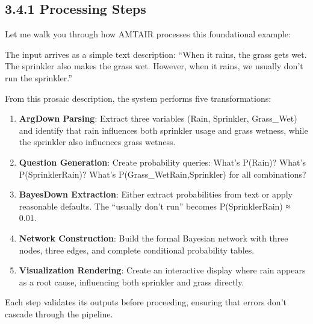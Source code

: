 \documentclass[
  11pt,
  letterpaper,
  openany]{book}
\providecommand{\tightlist}{%
  \setlength{\itemsep}{0pt}\setlength{\parskip}{0pt}}
\begin{document}
\subsection{3.4.1 Processing Steps}\label{sec-rsg-processing}

Let me walk you through how AMTAIR processes this foundational example:

The input arrives as a simple text description: ``When it rains, the
grass gets wet. The sprinkler also makes the grass wet. However, when it
rains, we usually don't run the sprinkler.''

From this prosaic description, the system performs five transformations:

\begin{enumerate}
\def\labelenumi{\arabic{enumi}.}
\tightlist
\item
  \textbf{ArgDown Parsing}: Extract three variables (Rain, Sprinkler,
  Grass\_Wet) and identify that rain influences both sprinkler usage and
  grass wetness, while the sprinkler also influences grass wetness.
\item
  \textbf{Question Generation}: Create probability queries: What's
  P(Rain)? What's P(Sprinkler\textbar Rain)? What's
  P(Grass\_Wet\textbar Rain,Sprinkler) for all combinations?
\item
  \textbf{BayesDown Extraction}: Either extract probabilities from text
  or apply reasonable defaults. The ``usually don't run'' becomes
  P(Sprinkler\textbar Rain) ≈ 0.01.
\item
  \textbf{Network Construction}: Build the formal Bayesian network with
  three nodes, three edges, and complete conditional probability tables.
\item
  \textbf{Visualization Rendering}: Create an interactive display where
  rain appears as a root cause, influencing both sprinkler and grass
  directly.
\end{enumerate}

Each step validates its outputs before proceeding, ensuring that errors
don't cascade through the pipeline.
\end{document}
